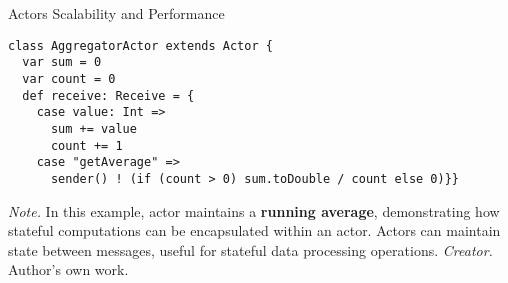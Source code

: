 \begin{table}[H]
\caption{Actors Scalability and Performance}
\begin{lstlisting}
class AggregatorActor extends Actor {
  var sum = 0
  var count = 0
  def receive: Receive = {
    case value: Int =>
      sum += value
      count += 1
    case "getAverage" =>
      sender() ! (if (count > 0) sum.toDouble / count else 0)}}
\end{lstlisting}
\small
\textit{Note.} In this example, actor maintains a \textbf{running average}, demonstrating how stateful computations can be encapsulated within an actor. Actors can maintain state between messages, useful for stateful data processing operations.
\textit{Creator.} Author's own work.
\end{table}